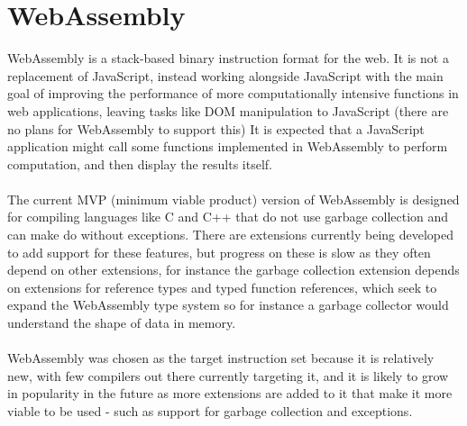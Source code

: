 \documentclass[12pt,twoside,notitlepage]{report}
\newcommand{\cfbox}[2]{%
	\colorlet{currentcolor}{.}%
	{\color{#1}%
		\fbox{\color{currentcolor}#2}}%
}
\newcommand\note[1]{\noindent\cfbox{blue}{\parbox{\textwidth}{\textcolor{blue}{#1}}}}
\begin{document}
\section{WebAssembly}
WebAssembly\cite{webassembly} is a stack-based binary instruction format for the web. It is not a replacement of JavaScript, instead working alongside JavaScript with the main goal of improving the performance of  more computationally intensive functions in web applications, leaving tasks like DOM manipulation to JavaScript (there are no plans for WebAssembly to support this) It  is  expected  that  a  JavaScript  application might  call  some  functions  implemented  in  WebAssembly  to  perform  computation,  and then display the results itself.
\\\\
The current MVP (minimum viable product) version of WebAssembly is designed for compiling languages like C and C++ that do not use garbage collection and can make do without exceptions. There are extensions currently being developed to add support for these features, but progress on these is slow as they often depend on other extensions, for instance the garbage collection extension depends on extensions for reference types and typed function references, which seek to expand the WebAssembly type system so for instance a garbage collector would understand the shape of data in memory\cite{Wgce}.
\\\\
WebAssembly was chosen as the target instruction set because it is relatively new, with few compilers out there currently targeting it, and it is likely to grow in popularity in the future as more extensions are added to it that make it more viable to be used - such as support for garbage collection and exceptions.

\note{TODO Alan suggests moving to Preparation, and giving an overview of WA's linguistic features. I already have a bit of an overview in the code generation section, but these are the main ones:
\begin{itemize}
	\item Stack based, structured (but compiler doesn't use this structure much / goes for unstructured options)
	\item Local variables get/set/tee
	\item No swap or dup instructions
	\item Verified i32/f32 types, must know signature of function for all function calls, blocks have a result type
	\item Can branch only out of a block early, or to the start of a loop
	\item JS interface can only pass i32 and f32 values - no strings / structs or anything
\end{itemize}}
\end{document}
